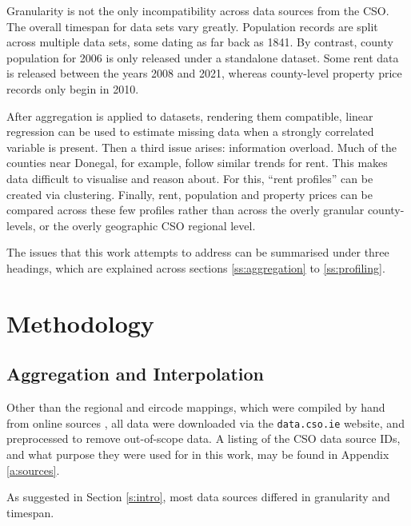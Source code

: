 \documentclass[twocolumn]{article}
\begin{document}
Granularity is not the only incompatibility across data sources from the CSO.
The overall timespan for data sets vary greatly.  Population records are split
across multiple data sets, some dating as far back as 1841.  By contrast,
county population for 2006 is only released under a standalone dataset.  Some
rent data is released between the years 2008 and 2021, whereas county-level
property price records only begin in 2010.

After aggregation is applied to datasets, rendering them compatible, linear
regression can be used to estimate missing data when a strongly correlated
variable is present.  Then a third issue arises: information overload.  Much of
the counties near Donegal, for example, follow similar trends for rent.  This
makes data difficult to visualise and reason about.  For this, ``rent
profiles'' can be created via clustering.  Finally, rent, population and
property prices can be compared across these few profiles rather than across
the overly granular county-levels, or the overly geographic CSO regional
level.

The issues that this work attempts to address can be summarised under three headings,
which are explained across sections \ref{ss:aggregation} to
\ref{ss:profiling}.

\section{Methodology}
\subsection{Aggregation and Interpolation\label{ss:aggregation}}
Other than the regional and eircode mappings, which were compiled by hand from
online sources \cite{eircode19, cso_regions}, all data were downloaded via the
{\tt data.cso.ie} website, and preprocessed to remove out-of-scope data.  A listing of
the CSO data source IDs, and what purpose they were used for in this work, may
be found in Appendix \ref{a:sources}.

As suggested in Section \ref{s:intro}, most data sources differed in granularity
and timespan. \\
\end{document}

